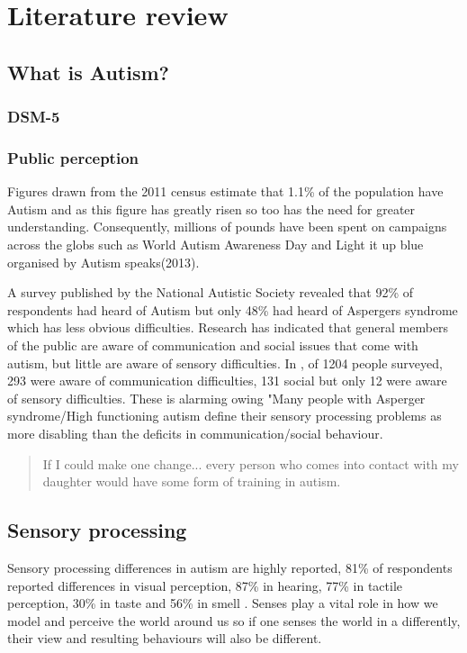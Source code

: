 \documentclass[11pt]{report}
\begin{document}
\chapter{Literature review}

\section{What is Autism?}

\subsection{DSM-5}

\subsection{Public perception}
Figures drawn from the 2011 census estimate that 1.1\% of the population have Autism\cite{nas} and as this figure has greatly risen\cite{increasingprevalence} so too has the need for greater understanding\cite{autism_awareness}. Consequently, millions of pounds have been spent on campaigns across the globs such as World Autism Awareness Day and Light it up blue organised by Autism speaks(2013)\cite{autism_awareness}.

A survey published by the National Autistic Society revealed that 92\% of respondents had heard of Autism but only 48\% had heard of Aspergers syndrome which has less obvious difficulties. Research has indicated that general members of the public are aware of communication and social issues that come with autism\cite{autismmisconception}, but little are aware of sensory difficulties\cite{autism_awareness}. In \cite{autism_awareness}, of 1204 people surveyed, 293 were aware of communication difficulties, 131 social but only 12 were aware of sensory difficulties. These is alarming owing "Many people with Asperger syndrome/High functioning autism define their sensory processing problems as more disabling than the deficits in communication/social behaviour\cite{olgab}.

\begin{quote}
If I could make one change... every person who comes into contact with my daughter would have some form of training in autism.\cite{nasschool}
\end{quote}


\section{Sensory processing}
Sensory processing differences in autism are highly reported, 81\% of respondents reported differences in visual perception, 87\% in hearing, 77\% in tactile perception, 30\% in taste and 56\% in smell \cite{sensory_leisure}. Senses play a vital role in how we model and perceive the world around us so if one senses the world in a differently, their view and resulting behaviours will also be different. 
\end{document}
